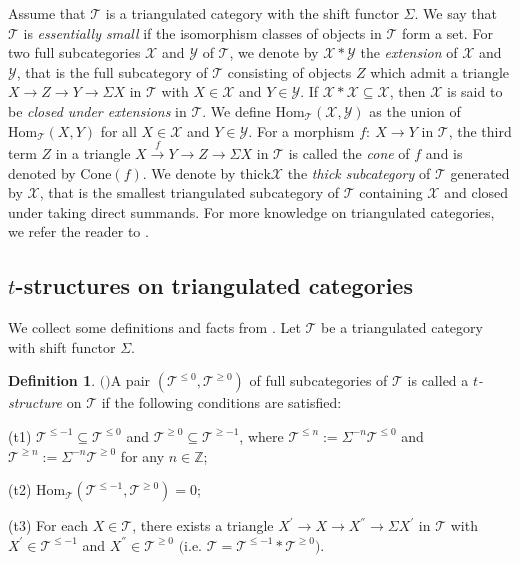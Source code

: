 \documentclass[11pt,a4paper]{amsart}
\numberwithin{equation}{section} \theoremstyle{plain}
\numberwithin{equation}{section} \theoremstyle{definition}
\newtheorem{definition}[lem]{Definition}
\newenvironment{df}{\begin{definition}\rm}{\end{definition}}
\begin{document}
Assume that $\mathcal{T}$ is a triangulated category with the shift functor $\Sigma$. We say that $\mathcal{T}$ is \emph{essentially small} if the isomorphism classes of objects in $\mathcal{T}$ form a set. For two full subcategories $\mathcal{X}$ and $\mathcal{Y}$ of $\mathcal{T}$, we denote by $\mathcal{X}\ast\mathcal{Y}$ the \emph{extension} of $\mathcal{X}$ and $\mathcal{Y}$, that is the full subcategory of $\mathcal{T}$ consisting of objects $Z$ which admit a triangle $X\rightarrow Z\rightarrow Y\rightarrow \Sigma X$ in $\mathcal{T}$ with $X\in\mathcal{X}$ and $Y\in\mathcal{Y}$. If $\mathcal{X}\ast\mathcal{X}\subseteq\mathcal{X}$, then $\mathcal{X}$ is said to be \emph{closed under extensions} in $\mathcal{T}$. We define $\mathrm{Hom}_{\mathcal{T}}(\mathcal{X},\mathcal{Y})$ as the union of $\mathrm{Hom}_{\mathcal{T}}(X,Y)$ for all $X\in\mathcal{X}$ and $Y\in\mathcal{Y}$. For a morphism $f:~X\rightarrow Y$ in $\mathcal{T}$, the third term $Z$ in a triangle $X\xrightarrow{f} Y\rightarrow Z\rightarrow \Sigma X$ in $\mathcal{T}$ is called the \emph{cone} of $f$ and is denoted by $\mathrm{Cone}(f)$. We denote by $\mathrm{thick}\mathcal{X}$ the \emph{thick subcategory} of $\mathcal{T}$ generated by $\mathcal{X}$, that is the smallest triangulated subcategory of $\mathcal{T}$ containing $\mathcal{X}$ and closed under taking direct summands. For more knowledge on triangulated categories, we refer the reader to \cite{H, N0}.


\subsection{$t$-structures on triangulated categories}
\noindent

We collect some definitions and facts from \cite{BBD}. Let $\mathcal{T}$ be a triangulated category with shift functor $\Sigma$.

\begin{df}
$($\cite[Definition 1.3.1]{BBD}$)$\label{dfn0} A pair $(\mathcal{T}^{\leq0},\mathcal{T}^{\geq0})$ of full subcategories of $\mathcal{T}$ is called a \emph{$t$-structure} on $\mathcal{T}$ if the following conditions are satisfied:

(t1) $\mathcal{T}^{\leq-1}\subseteq\mathcal{T}^{\leq0}$ and $\mathcal{T}^{\geq0}\subseteq\mathcal{T}^{\geq-1}$, where $\mathcal{T}^{\leq n}:=\Sigma^{-n}\mathcal{T}^{\leq0}$ and $\mathcal{T}^{\geq n}:=\Sigma^{-n}\mathcal{T}^{\geq0}$ for any $n\in\mathbb{Z}$;

(t2) $\mathrm{Hom}_{\mathcal{T}}(\mathcal{T}^{\leq-1},\mathcal{T}^{\geq0})=0$;

(t3) For each $X\in\mathcal{T}$, there exists a triangle $X^{'}\rightarrow X\rightarrow X^{''}\rightarrow \Sigma X^{'}$ in $\mathcal{T}$ with $X^{'}\in\mathcal{T}^{\leq-1}$ and $X^{''}\in\mathcal{T}^{\geq0}$ $($i.e. $\mathcal{T}=\mathcal{T}^{\leq-1}\ast\mathcal{T}^{\geq0})$.
\end{df}
\end{document}
